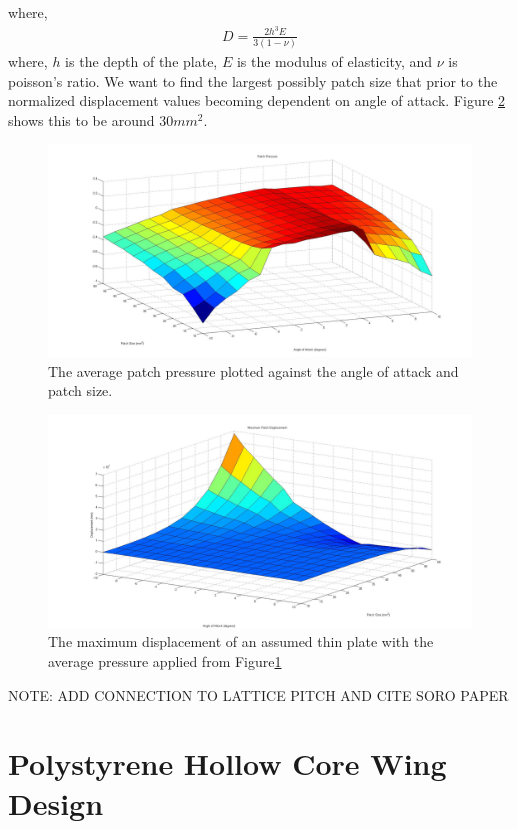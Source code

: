 \documentclass[11pt]{ucthesis}
\begin{document}
where,
\begin{eqnarray}
D = \frac{2h^3E}{3(1-\nu)}
\end{eqnarray}
where, $h$ is the depth of the plate, $E$ is the modulus of elasticity, and $\nu$ is poisson's ratio. We want to find the largest possibly patch size that prior to the normalized displacement values becoming dependent on angle of attack. Figure \ref{fig:PatchDisp} shows this to be around $30mm^2$. 
\begin{figure}[h]
\centering
\includegraphics[width=1\linewidth]{Figures/FreePatchPressure.jpg}
\caption{The average patch pressure plotted against the angle of attack and patch size.}
\label{fig:PProfile}
\end{figure}
\begin{figure}[h]
\centering
\includegraphics[width=1\linewidth]{Figures/MaximumPatchDisplacement.jpg}
\caption{The maximum displacement of an assumed thin plate with the average pressure applied from Figure\ref{fig:PProfile}}
\label{fig:PatchDisp}
\end{figure}

{\color{red} NOTE: ADD CONNECTION TO LATTICE PITCH AND CITE SORO PAPER}

\section{Polystyrene Hollow Core Wing Design}
\end{document}
